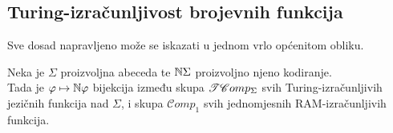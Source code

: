 \subsection{Turing-izračunljivost brojevnih funkcija}


Sve dosad napravljeno može se iskazati u jednom vrlo općenitom obliku.

\begin{propozicija}[{name=[izomorfizam skupova $\TComp$ i $\mathscr Comp_1$]}]\label{pp:trackbij}
Neka je $\Sigma$ proizvoljna abeceda te ${\mathbb N}\Sigma$ proizvoljno njeno kodiranje. \\ Tada je $\varphi\mapsto{\mathbb N}\varphi$ bijekcija između skupa $\TComp$ svih Turing-izračunljivih jezičnih funkcija nad $\Sigma$, i skupa $\mathscr Comp_1$ svih jednomjesnih RAM-izračunljivih funkcija.
\end{propozicija}

